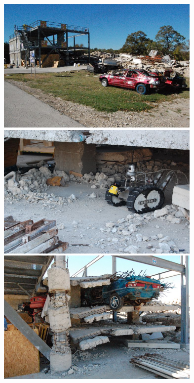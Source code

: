 \documentclass{UCF_ETD}
\begin{document}
\begin{figure}[H] 
\begin{center}
\includegraphics[scale=0.75]{RobustRegistration/FrontOverViewCCP}
\includegraphics[scale=0.75]{RobustRegistration/RobotViewCCP}
\includegraphics[scale=0.75]{RobustRegistration/CloseUpFrontCCP}

\end{center}
\end{figure}
\end{document}
